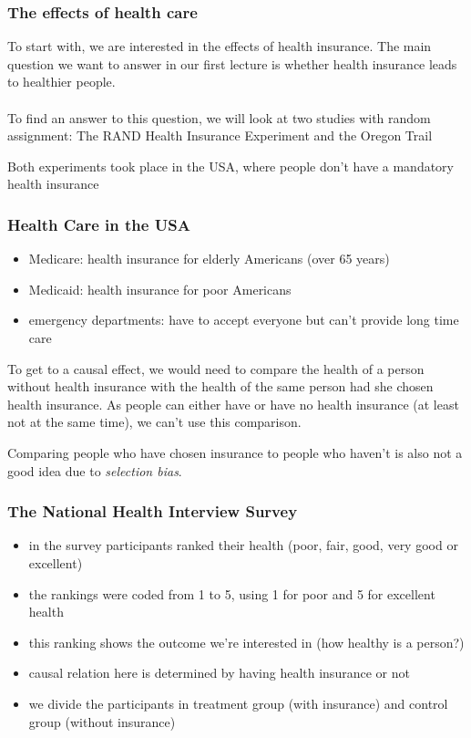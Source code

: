 \documentclass{beamer}
\begin{document}
\begin{frame}
\frametitle{The effects of health care}
To start with, we are interested in the effects of health insurance. The main question we want to answer in our first lecture is whether health insurance leads to healthier people. 
\\~\\
To find an answer to this question, we will look at two studies with random assignment: The RAND Health Insurance Experiment and the Oregon Trail

Both experiments took place in the USA, where people don't have a mandatory health insurance 

\end{frame}
\begin{frame}
\frametitle{Health Care in the USA}
\begin{itemize}
\item Medicare: health insurance for elderly Americans (over 65 years)
\item Medicaid: health insurance for poor Americans 
\item emergency departments: have to accept everyone but can't provide long time care 
\end{itemize}

To get to a causal effect, we would need to compare the health of a person without health insurance with the health of the same person had she chosen health insurance. As people can either have or have no health insurance (at least not at the same time), we can't use this comparison. 

Comparing people who have chosen insurance to people who haven't is also not a good idea due to \textit{selection bias}.

\end{frame}
\begin{frame}
\frametitle{The National Health Interview Survey}
\begin{itemize}
\item in the survey participants ranked their health (poor, fair, good, very good or excellent)
\item the rankings were coded from 1 to 5, using 1 for poor and 5 for excellent health
\item this ranking shows the outcome we're interested in (how healthy is a person?)
\item causal relation here is determined by having health insurance or not
\item we divide the participants in treatment group (with insurance) and control group (without insurance)
\end{itemize} 
\end{frame}
\end{document}
